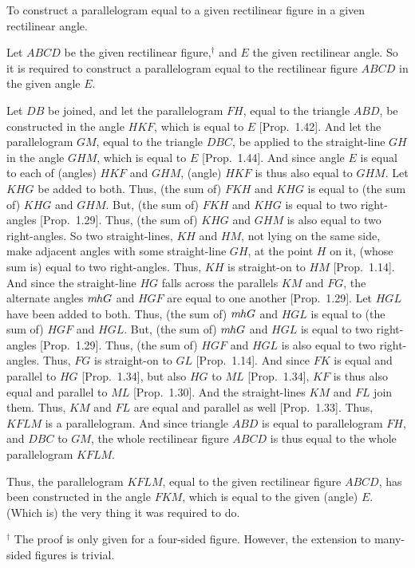 \begin{Parallel}{}{}
{To construct a parallelogram equal to a given rectilinear figure in a given
rectilinear angle.

Let $ABCD$ be the given rectilinear figure,$^\dag$ and $E$ the given rectilinear angle.
So it is required to construct a parallelogram equal to the rectilinear figure
$ABCD$ in the given angle $E$.

\epsfysize=2.7in
\centerline{}

Let $DB$ be joined, and let the parallelogram $FH$, equal to
the triangle $ABD$, be
constructed in the angle $HKF$, which is equal to $E$ [Prop.~1.42].
And let the parallelogram $GM$, equal to the triangle $DBC$, be
applied to the straight-line $GH$ in the angle $GHM$,
which is equal to $E$ [Prop.~1.44]. And since angle $E$ is equal to each of
(angles) $HKF$ and $GHM$,  (angle) $HKF$ is thus also equal to $GHM$. 
Let $KHG$ be added to both. Thus, (the sum of) $FKH$ and $KHG$ is
equal to (the sum of) $KHG$ and $GHM$. But, (the sum of) $FKH$ and $KHG$ is equal to
two right-angles [Prop.~1.29]. Thus, (the sum of) $KHG$ and $GHM$ is also equal to
two right-angles. So two straight-lines, $KH$ and $HM$, not lying on the same side, make  adjacent angles with some straight-line $GH$, 
at the point $H$ on it, (whose sum is) equal to two right-angles.
Thus, $KH$ is straight-on to $HM$ [Prop.~1.14].
And since the straight-line $HG$ falls across the parallels $KM$ and $FG$, the alternate angles
$m\kern -.7pt hG$ and $HGF$ are equal to one another [Prop.~1.29]. Let $HGL$ have
been added to both. Thus, (the sum of) $m\kern -.7pt hG$ and $HGL$ is equal to 
(the sum of) $HGF$ and $HGL$.
But, (the sum of) $m\kern -.7pt hG$ and $HGL$ is equal to two right-angles [Prop.~1.29].
Thus, (the sum of) $HGF$ and $HGL$ is also equal to two right-angles.
Thus, $FG$ is straight-on to $GL$ [Prop.~1.14]. And since $FK$ is
equal and parallel to $HG$ [Prop.~1.34], but also $HG$ to $ML$ [Prop.~1.34],
$KF$ is thus also equal and parallel to $ML$ [Prop.~1.30]. And the straight-lines $KM$ and
$FL$ join them. Thus, $KM$ and $FL$ are equal and parallel as well [Prop.~1.33].
Thus, $KFLM$ is a parallelogram. And since triangle $ABD$ is equal to parallelogram $FH$, and $DBC$ to $GM$, the whole rectilinear figure
$ABCD$ is thus equal to the whole parallelogram $KFLM$.

Thus, the parallelogram $KFLM$, equal to the given
rectilinear figure $ABCD$, has been constructed in the angle
$FKM$, which is equal to the given (angle) $E$. (Which is) the very thing it was
required to do.}
\end{Parallel}
{\footnotesize \noindent$^\dag$ The proof is only given for a four-sided figure. However, the extension to many-sided figures is
trivial.}

